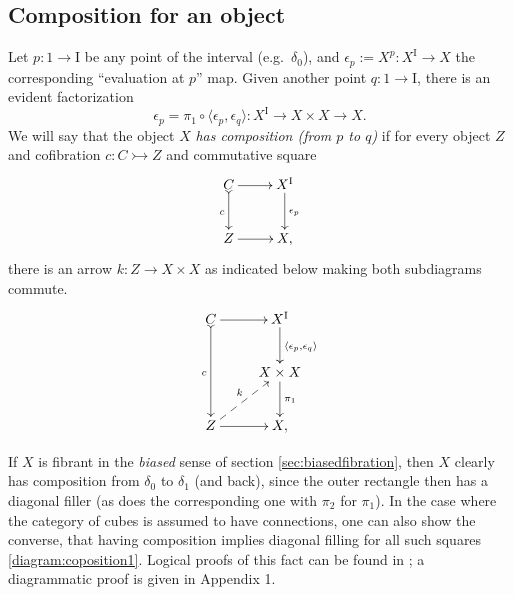 \documentclass[11pt]{article}
\newcommand{\mono}{\ensuremath{\rightarrowtail}}
\newcommand{\ra}{\ensuremath{\rightarrow}}
\newcommand{\I}{\ensuremath{\mathrm{I}}}
\theoremstyle{remark}
\theoremstyle{definition}
\begin{document}
\subsection{Composition for an object}

Let $p : 1 \ra \I$ be any point of the interval (e.g.\ $\delta_0$), and $\epsilon_p := X^p : X^\I \to X$ the corresponding ``evaluation at $p$'' map.  Given another point $q : 1 \to \I$, there is an evident factorization 
\[
\epsilon_p = \pi_1 \circ \langle \epsilon_p, \epsilon_q\rangle : X^\I \to X\times X \to X.
\]
We will say that the object $X$ \emph{has composition (from $p$ to $q$)} if for every object $Z$ and cofibration $c:C\mono Z$ and commutative square 
\begin{equation}\label{diagram:composition1}
\xymatrix{
C \ar@{>->}[d]_{c} \ar[r]  & X^\I \ar[d]^{\epsilon_p} \\
Z \ar[r] & X,
}
\end{equation}
there is an arrow $k : Z \to X\times X$ as indicated below making both subdiagrams commute.
\begin{equation}\label{diagram:composition2}
\xymatrix{
C \ar@{>->}[dd]_{c} \ar[r]  & X^\I \ar[d]^{\langle \epsilon_p, \epsilon_q\rangle} \\
& X\times X \ar[d]^{\pi_1} \\
Z \ar[r] \ar@{-->}[ru]^{k} & X,
}
\end{equation}

If $X$ is fibrant in the \emph{biased} sense of section \ref{sec:biasedfibration}, then $X$ clearly has composition from $\delta_0$ to $\delta_1$ (and back), since the outer rectangle then has a diagonal filler (as does the corresponding one with $\pi_2$ for $\pi_1$).   In the case where the category of cubes is assumed to have connections, one can also show the converse, that having composition implies diagonal filling for all such squares \eqref{diagram:coposition1}.  Logical proofs of this fact can be found in \cite{CCHM,OP}; a diagrammatic proof is given in Appendix 1.
\end{document}
